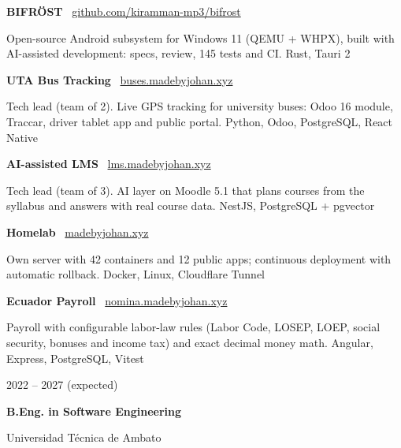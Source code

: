 \documentclass[9pt]{extarticle}
\begin{document}
\begin{minipage}[t]{\anchoPrincipal}
\textbf{BIFRÖST} \textbar\ {\small\href{https://github.com/kiramman-mp3/bifrost}{github.com/kiramman-mp3/bifrost}}\par
Open-source Android subsystem for Windows 11 (QEMU + WHPX), built with AI-assisted development: specs, review, 145 tests and CI. {\small\color{suave}Rust, Tauri 2}\par\vspace{4pt}
\textbf{UTA Bus Tracking} \textbar\ {\small\href{https://buses.madebyjohan.xyz}{buses.madebyjohan.xyz}}\par
Tech lead (team of 2). Live GPS tracking for university buses: Odoo 16 module, Traccar, driver tablet app and public portal. {\small\color{suave}Python, Odoo, PostgreSQL, React Native}\par\vspace{4pt}
\textbf{AI-assisted LMS} \textbar\ {\small\href{https://lms.madebyjohan.xyz}{lms.madebyjohan.xyz}}\par
Tech lead (team of 3). AI layer on Moodle 5.1 that plans courses from the syllabus and answers with real course data. {\small\color{suave}NestJS, PostgreSQL + pgvector}\par\vspace{4pt}
\textbf{Homelab} \textbar\ {\small\href{https://madebyjohan.xyz/en}{madebyjohan.xyz}}\par
Own server with 42 containers and 12 public apps; continuous deployment with automatic rollback. {\small\color{suave}Docker, Linux, Cloudflare Tunnel}\par\vspace{4pt}
\textbf{Ecuador Payroll} \textbar\ {\small\href{https://nomina.madebyjohan.xyz}{nomina.madebyjohan.xyz}}\par
Payroll with configurable labor-law rules (Labor Code, LOSEP, LOEP, social security, bonuses and income tax) and exact decimal money math. {\small\color{suave}Angular, Express, PostgreSQL, Vitest}\par

{\color{suave}\small 2022 – 2027 (expected)}\par
\textbf{B.Eng. in Software Engineering}\par
Universidad Técnica de Ambato\par
\end{minipage}
\end{document}
